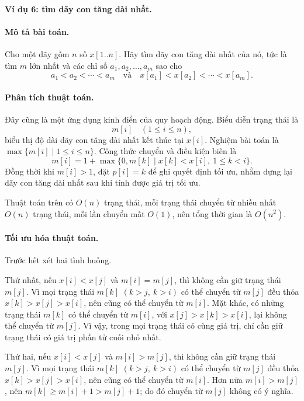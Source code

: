 \documentclass[11pt]{article}
\begin{document}
\paragraph{Ví dụ 6: tìm dãy con tăng dài nhất.}

\paragraph{Mô tả bài toán.}
Cho một dãy gồm \(n\) số \(x[1..n]\). Hãy tìm dãy con tăng dài nhất của nó,
tức là tìm \(m\) lớn nhất và các chỉ số \(a_1,a_2,\ldots,a_m\) sao cho
\[
  a_1<a_2<\cdots<a_m
  \quad\text{và}\quad
  x[a_1]<x[a_2]<\cdots<x[a_m].
\]

\paragraph{Phân tích thuật toán.}
Đây cũng là một ứng dụng kinh điển của quy hoạch động. Biểu diễn trạng thái
là
\[
  m[i]\quad (1\le i\le n),
\]
biểu thị độ dài dãy con tăng dài nhất kết thúc tại \(x[i]\). Nghiệm bài toán
là \(\max\{m[i]\mid 1\le i\le n\}\). Công thức chuyển và điều kiện biên là
\[
  m[i]=1+\max\{0,m[k]\mid x[k]<x[i],\ 1\le k<i\}.
\]
Đồng thời khi \(m[i]>1\), đặt \(p[i]=k\) để ghi quyết định tối ưu, nhằm dựng
lại dãy con tăng dài nhất sau khi tính được giá trị tối ưu.

Thuật toán trên có \(O(n)\) trạng thái, mỗi trạng thái chuyển từ nhiều nhất
\(O(n)\) trạng thái, mỗi lần chuyển mất \(O(1)\), nên tổng thời gian là
\(O(n^2)\).

\paragraph{Tối ưu hóa thuật toán.}
Trước hết xét hai tình huống.

Thứ nhất, nếu \(x[i]<x[j]\) và \(m[i]=m[j]\), thì không cần giữ trạng thái
\(m[j]\). Vì mọi trạng thái \(m[k]\) \((k>j,\ k>i)\) có thể chuyển từ
\(m[j]\) đều thỏa \(x[k]>x[j]>x[i]\), nên cũng có thể chuyển từ \(m[i]\). Mặt
khác, có những trạng thái \(m[k]\) có thể chuyển từ \(m[i]\), với
\(x[j]>x[k]>x[i]\), lại không thể chuyển từ \(m[j]\). Vì vậy, trong mọi trạng
thái có cùng giá trị, chỉ cần giữ trạng thái có giá trị phần tử cuối nhỏ
nhất.

Thứ hai, nếu \(x[i]<x[j]\) và \(m[i]>m[j]\), thì không cần giữ trạng thái
\(m[j]\). Vì mọi trạng thái \(m[k]\) \((k>j,\ k>i)\) có thể chuyển từ
\(m[j]\) đều thỏa \(x[k]>x[j]>x[i]\), nên cũng có thể chuyển từ \(m[i]\). Hơn
nữa \(m[i]>m[j]\), nên \(m[k]\ge m[i]+1>m[j]+1\); do đó chuyển từ \(m[j]\)
không có ý nghĩa.
\end{document}
